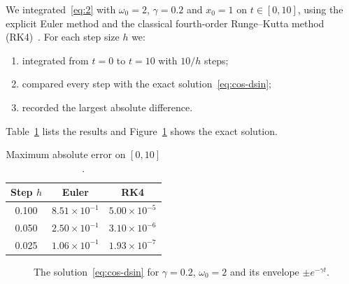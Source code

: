 \documentclass[11pt,a4paper]{article}
\begin{document}
We integrated~\eqref{eq:2} with $\omega_{0}=2$, $\gamma=0.2$ and $x_{0}=1$ on $t\in[0,10]$, using the explicit Euler method and the classical fourth-order Runge--Kutta method (RK4)~\cite{ref2}. For each step size $h$ we:
\begin{enumerate}
  \item integrated from $t=0$ to $t=10$ with $10/h$ steps;
  \item compared every step with the exact solution~\eqref{eq:cos-dsin};
  \item recorded the largest absolute difference.
\end{enumerate}
Table~\ref{tab:err} lists the results and Figure~\ref{fig:the-solution} shows the exact solution.

\begin{table}[htbp]
  \centering
  \caption{Maximum absolute error on $[0,10]$.}
  \label{tab:err}
  \begin{tabular}{ccc}
    \toprule
    \textbf{Step $h$} & \textbf{Euler} & \textbf{RK4} \\
    \midrule
    0.100 & $8.51\times10^{-1}$ & $5.00\times10^{-5}$ \\
    0.050 & $2.50\times10^{-1}$ & $3.10\times10^{-6}$ \\
    0.025 & $1.06\times10^{-1}$ & $1.93\times10^{-7}$ \\
    \bottomrule
  \end{tabular}
\end{table}

\begin{figure}[htbp]
  \centering
  \caption{The solution~\eqref{eq:cos-dsin} for $\gamma=0.2$, $\omega_{0}=2$ and its envelope $\pm e^{-\gamma t}$.}
  \label{fig:the-solution}
\end{figure}
\end{document}
